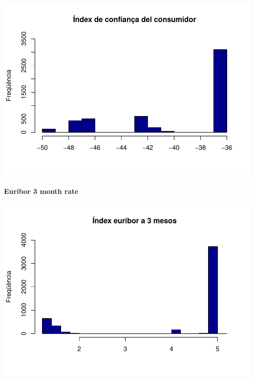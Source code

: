 \documentclass[
]{article}
\newenvironment{Shaded}{\begin{snugshade}}{\end{snugshade}}
\newcommand{\AttributeTok}[1]{\textcolor[rgb]{0.77,0.63,0.00}{#1}}
\newcommand{\DecValTok}[1]{\textcolor[rgb]{0.00,0.00,0.81}{#1}}
\newcommand{\FunctionTok}[1]{\textcolor[rgb]{0.00,0.00,0.00}{#1}}
\newcommand{\NormalTok}[1]{#1}
\newcommand{\SpecialCharTok}[1]{\textcolor[rgb]{0.00,0.00,0.00}{#1}}
\newcommand{\StringTok}[1]{\textcolor[rgb]{0.31,0.60,0.02}{#1}}
\begin{document}
\includegraphics{Entrega-1_files/figure-latex/unnamed-chunk-27-1.pdf}

\hypertarget{euribor-3-month-rate}{%
\paragraph{Euribor 3 month rate}\label{euribor-3-month-rate}}

\begin{Shaded}
\end{Shaded}

\includegraphics{Entrega-1_files/figure-latex/unnamed-chunk-28-1.pdf}
\end{document}
